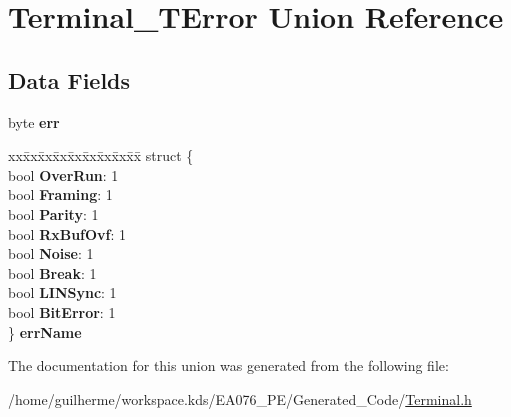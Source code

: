 \hypertarget{union_terminal___t_error}{}\section{Terminal\+\_\+\+T\+Error Union Reference}
\label{union_terminal___t_error}
\subsection*{Data Fields}
\begin{DoxyCompactItemize}
\item 
\mbox{\label{union_terminal___t_error_a260432ce0df83062cd7185fa0a54b075}} 
byte {\bfseries err}
\item 
\mbox{\label{union_terminal___t_error_ae891e5f2c5633c3ffaac544874105998}} 
\begin{tabbing}
xx\=xx\=xx\=xx\=xx\=xx\=xx\=xx\=xx\=\kill
struct \{\\
\>bool {\bfseries OverRun}: 1\\
\>bool {\bfseries Framing}: 1\\
\>bool {\bfseries Parity}: 1\\
\>bool {\bfseries RxBufOvf}: 1\\
\>bool {\bfseries Noise}: 1\\
\>bool {\bfseries Break}: 1\\
\>bool {\bfseries LINSync}: 1\\
\>bool {\bfseries BitError}: 1\\
\} {\bfseries errName}\\

\end{tabbing}\end{DoxyCompactItemize}


The documentation for this union was generated from the following file\+:\begin{DoxyCompactItemize}
\item 
/home/guilherme/workspace.\+kds/\+E\+A076\+\_\+\+P\+E/\+Generated\+\_\+\+Code/\hyperlink{_terminal_8h}{Terminal.\+h}\end{DoxyCompactItemize}
